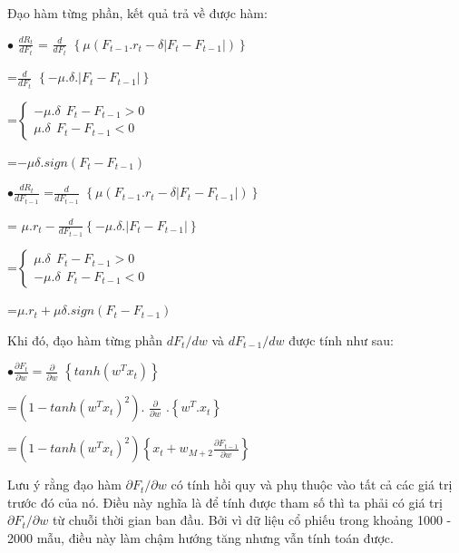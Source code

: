 \documentclass[14pt]{extreport}
\begin{document}
Đạo hàm từng phần, kết quả trả về được hàm:

$\bullet$ {\Large $\frac{dR_t}{dF_t}$ = $\frac{d}{dF_t} $ } $\left \{ \mu\left ( F_{t-1}.r_t-\delta\left | F_t-F_{t-1} \right | \right ) \right \}$


{\Large \hspace{1.2cm} =$\frac{d}{dF_t}$ } $\left \{ -\mu.\delta.\left | F_t-F_{t-1} \right | \right \}$


\hspace{1.2cm}=$\left\{\begin{matrix}
 -\mu.\delta \ \  F_t-F_{t-1}>0  & \\ 
 \mu.\delta \ \ F_t-F_{t-1}<0
\end{matrix}\right.$


\hspace{1.2cm}=$-\mu\delta.sign\left ( F_t-F_{t-1} \right )$

{\Large $\bullet \frac{dR_t}{dF_{t-1}}$} {\Large=$\frac{d}{dF_{t-1}}$ }$\left \{ \mu\left ( F_{t-1}.r_t-\delta\left | F_t-F_{t-1} \right | \right ) \right \}$


\hspace{1.2cm} = {\Large$\mu.r_t-\frac{d}{dF_{t-1}}$}$\left \{ -\mu.\delta.\left | F_t-F_{t-1} \right | \right \}$


\hspace{1.2cm}=$\left\{\begin{matrix}
 \mu.\delta \ \  F_t-F_{t-1}>0  & \\ 
 -\mu.\delta \ \ F_t-F_{t-1}<0
\end{matrix}\right.$


\hspace{1.2cm}=$\mu.r_t+\mu \delta.sign\left ( F_t-F_{t-1} \right )$


Khi đó, đạo hàm từng phần $dF_t/dw$ và $dF_{t-1}/dw$ được tính như sau:

{\Large $\bullet\frac{\partial F_t}{\partial w} = \frac{\partial}{\partial w}$ }$\left \{ tanh(w^Tx_t) \right \}$

\hspace{1.2cm}=$\left ( 1-tanh\left ( w^Tx_t \right )^2 \right ).$ {\Large$\frac{\partial}{\partial w}$ } $.\left \{ w^T.x_t \right \}$

\hspace{1.2cm}=$\left ( 1-tanh\left ( w^Tx_t \right )^2 \right )\left \{ x_t+w_{M+2}\frac{\partial F_{t-1}}{\partial w}\right \}$

Lưu ý rằng đạo hàm $\partial F_t/\partial w$ có tính hồi quy và phụ thuộc vào tất cả các giá trị trước đó của nó. Điều này nghĩa là để tính được tham số thì ta phải có giá trị $\partial F_t/\partial w$ từ chuỗi thời gian ban đầu. Bởi vì dữ liệu cổ phiếu trong khoảng 1000 - 2000 mẫu, điều này làm chậm hướng tăng nhưng vẫn tính toán được.
\end{document}
